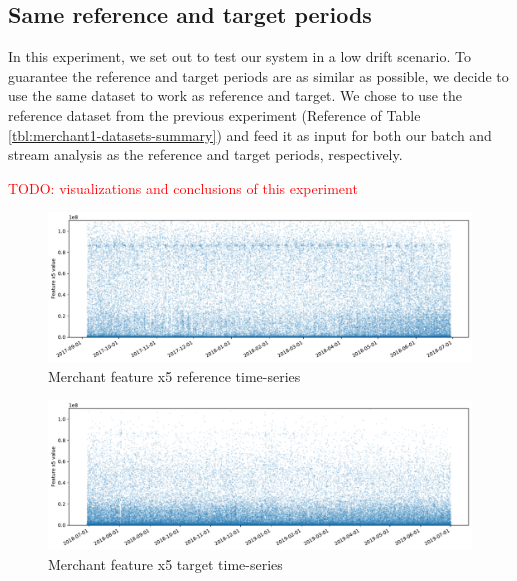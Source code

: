 \subsection{Same reference and target periods}
In this experiment, we set out to test our system in a low drift scenario. To guarantee the reference and target periods are as similar as possible, we decide to use the same dataset to work as reference and target. We chose to use the reference dataset from the previous experiment (Reference of Table \ref{tbl:merchant1-datasets-summary}) and feed it as input for both our batch and stream analysis as the reference and target periods, respectively.


\textcolor{red}{TODO: visualizations and conclusions of this experiment}


\begin{figure}[!htb]
    \begin{center}
      \includegraphics[scale=0.5]{figures/merchant-x5-reference.pdf}
      \caption{Merchant feature x5 reference time-series}
      \label{fig:merchant-x5-reference}
    \end{center}
\end{figure}
\begin{figure}[!htb]
    \begin{center}
      \includegraphics[scale=0.5]{figures/merchant-x5-target.pdf}
      \caption{Merchant feature x5 target time-series}
      \label{fig:merchant-x5-target}
    \end{center}
\end{figure}


